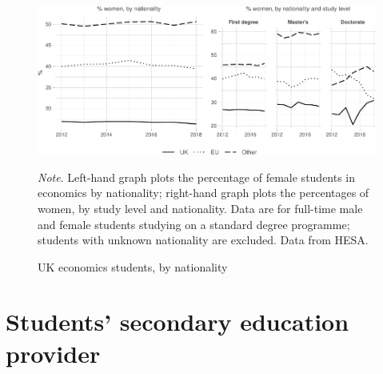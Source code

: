 \documentclass[a4paper, 1]{article}
\begin{document}
\begin{figure}[h!]
\centering
\includegraphics[width=\linewidth]{0-images/domicile-2-1.pdf}

\caption{UK economics students, by nationality}
\label{fig:domicile-2}
\justify\footnotesize\textit{Note}.  Left-hand graph plots the percentage of female students in economics by nationality; right-hand graph plots the percentages of women, by study level and nationality. Data are for full-time male and female students studying on a standard degree programme; students with unknown nationality are excluded. Data from HESA.
\end{figure}



\newpage

\hypertarget{sec:secondary}{%
\section{Students' secondary education provider}\label{sec:secondary}}
\end{document}
